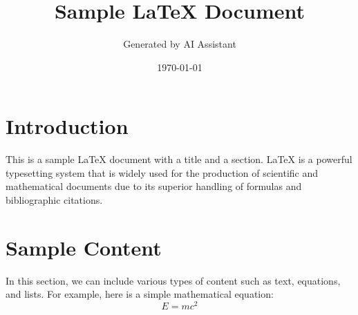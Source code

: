 \documentclass{article}
\title{Sample LaTeX Document}
\author{Generated by AI Assistant}
\date{\today}
\begin{document}
\maketitle

\section{Introduction}
This is a sample LaTeX document with a title and a section. LaTeX is a powerful typesetting system that is widely used for the production of scientific and mathematical documents due to its superior handling of formulas and bibliographic citations.

\section{Sample Content}
In this section, we can include various types of content such as text, equations, and lists. For example, here is a simple mathematical equation:
\[ E = mc^2 \]
\end{document}
